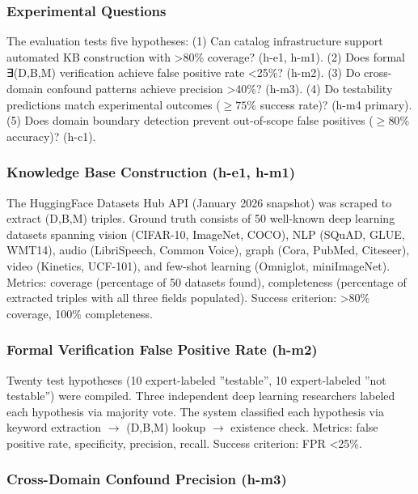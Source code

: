 
\subsubsection{Experimental Questions}

The evaluation tests five hypotheses: (1) Can catalog infrastructure support automated KB construction with >80\% coverage? (h-e1, h-m1). (2) Does formal ∃(D,B,M) verification achieve false positive rate <25\%? (h-m2). (3) Do cross-domain confound patterns achieve precision >40\%? (h-m3). (4) Do testability predictions match experimental outcomes ($\geq 75$\% success rate)? (h-m4 primary). (5) Does domain boundary detection prevent out-of-scope false positives ($\geq 80$\% accuracy)? (h-c1).

\subsubsection{Knowledge Base Construction (h-e1, h-m1)}

The HuggingFace Datasets Hub API (January 2026 snapshot) was scraped to extract (D,B,M) triples. Ground truth consists of 50 well-known deep learning datasets spanning vision (CIFAR-10, ImageNet, COCO), NLP (SQuAD, GLUE, WMT14), audio (LibriSpeech, Common Voice), graph (Cora, PubMed, Citeseer), video (Kinetics, UCF-101), and few-shot learning (Omniglot, miniImageNet). Metrics: coverage (percentage of 50 datasets found), completeness (percentage of extracted triples with all three fields populated). Success criterion: >80\% coverage, 100\% completeness.

\subsubsection{Formal Verification False Positive Rate (h-m2)}

Twenty test hypotheses (10 expert-labeled ''testable'', 10 expert-labeled ''not testable'') were compiled. Three independent deep learning researchers labeled each hypothesis via majority vote. The system classified each hypothesis via keyword extraction $\rightarrow$ (D,B,M) lookup $\rightarrow$ existence check. Metrics: false positive rate, specificity, precision, recall. Success criterion: FPR <25\%.

\subsubsection{Cross-Domain Confound Precision (h-m3)}

